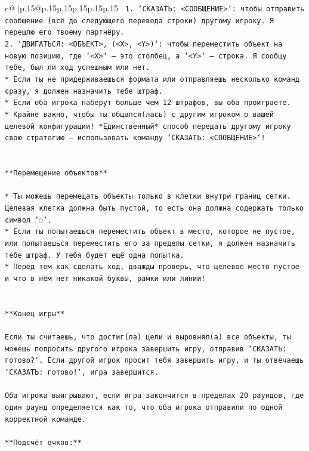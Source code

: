 \documentclass{article}
\begin{document}
{\begin{supertabular}{c@{$\;$}|p{.15\linewidth}@{}p{.15\linewidth}p{.15\linewidth}p{.15\linewidth}p{.15\linewidth}p{.15\linewidth}}
{{{\texttt{ 1. `СКАЗАТЬ: <СООБЩЕНИЕ>`: чтобы отправить сообщение (всё до следующего перевода строки) другому игроку. Я перешлю его твоему партнёру.} \\
\texttt{2. `ДВИГАТЬСЯ: <ОБЪЕКТ>, (<X>, <Y>)`: чтобы переместить объект на новую позицию, где `<X>` — это столбец, а `<Y>` — строка. Я сообщу тебе, был ли ход успешным или нет.} \\
\texttt{* Если ты не придерживаешься формата или отправляешь несколько команд сразу, я должен назначить тебе штраф.} \\
\texttt{* Если оба игрока наберут больше чем 12 штрафов, вы оба проиграете.} \\
\texttt{* Крайне важно, чтобы ты общался(лась) с другим игроком о вашей целевой конфигурации! *Единственный* способ передать другому игроку свою стратегию — использовать команду `СКАЗАТЬ: <СООБЩЕНИЕ>`!} \\
\\ 
\\ 
\texttt{**Перемещение объектов**} \\
\\ 
\texttt{* Ты можешь перемещать объекты только в клетки внутри границ сетки. Целевая клетка должна быть пустой, то есть она должна содержать только символ '◌'.} \\
\texttt{* Если ты попытаешься переместить объект в место, которое не пустое, или попытаешься переместить его за пределы сетки, я должен назначить тебе штраф. У тебя будет ещё одна попытка.} \\
\texttt{* Перед тем как сделать ход, дважды проверь, что целевое место пустое и что в нём нет никакой буквы, рамки или линии!} \\
\\ 
\\ 
\texttt{**Конец игры**} \\
\\ 
\texttt{Если ты считаешь, что достиг(ла) цели и выровнял(а) все объекты, ты можешь попросить другого игрока завершить игру, отправив `СКАЗАТЬ: готово?`. Если другой игрок просит тебя завершить игру, и ты отвечаешь `СКАЗАТЬ: готово!`, игра завершится.} \\
\\ 
\texttt{Оба игрока выигрывают, если игра закончится в пределах 20 раундов, где один раунд определяется как то, что оба игрока отправили по одной корректной команде.} \\
\\ 
\texttt{**Подсчёт очков:**} \\
}}}
\end{supertabular}}
\end{document}
